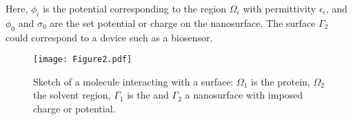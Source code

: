 \noindent Here, $\phi_i$ is the potential corresponding to the region $\Omega_i$ with permittivity $\epsilon_i$, and $\phi_0$ and $\sigma_0$ are the set potential or charge on the nanosurface. The surface $\Gamma_2$ could correspond to a device such as a biosensor.

\begin{figure}
   \texttt{[image: Figure2.pdf]} 
   \caption{Sketch of a molecule interacting with a surface: $\Omega_1$ is the protein, $\Omega_2$ the solvent region, $\Gamma_1$ is the  \ses and $\Gamma_2$ a nanosurface with imposed charge or potential.}
   \label{fig:molecule_surface}
\end{figure}